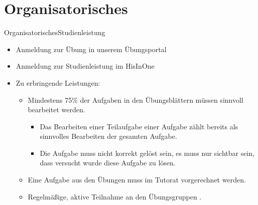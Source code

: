 
\section{Organisatorisches}

\begin{frame}{Organisatorisches}{Studienleistung }
  \begin{itemize}
    \item Anmeldung zur \alert{Übung} in unserem \alert{Übungsportal}
    \item Anmeldung zur \alert{Studienleistung} im \alert{HisInOne}
    \item Zu erbringende Leistungen:
    \begin{itemize}
      \item Mindestens \alert{75\%} der Aufgaben in den Übungsblättern müssen sinnvoll bearbeitet werden.
      \begin{itemize}
        \item Das Bearbeiten \alert{einer Teilaufgabe} einer Aufgabe zählt bereits als sinnvolles Bearbeiten der gesamten Aufgabe.
        \item Die Aufgabe muss \alert{nicht korrekt} gelöst sein, es muss nur sichtbar sein, dass \alert{versucht} wurde diese Aufgabe zu lösen.
      \end{itemize}
      \item Eine Aufgabe aus den Übungen muss im Tutorat \alert{vorgerechnet} werden.
      \item \alert{Regelmäßige, aktive Teilnahme} an den Übungsgruppen \Smiley[1.5][PrimaryColorDimmed].
    \end{itemize}
  \end{itemize}
\end{frame}

